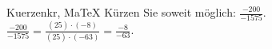 \begin{MAufgabe}{Kuerzen}{kr, MaTeX}
K\"urzen Sie soweit m\"oglich: $\frac{-200}{-1575}$.\\ 
\ifLsg\MLoesung
\quad $\frac{-200}{-1575}=\frac{(25)\cdot(-8)}{(25)\cdot(-63)}=\frac{-8}{-63}$.\else\relax\fi
 \end{MAufgabe}